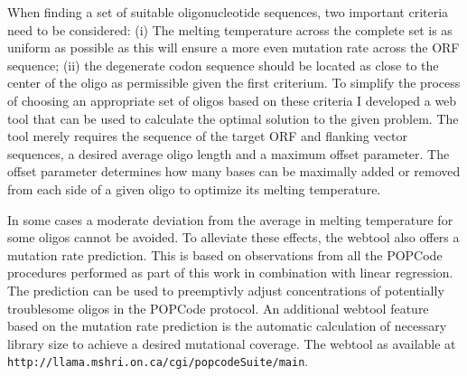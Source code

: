 When finding a set of suitable oligonucleotide sequences, two important criteria need to be considered: 
(i) The melting temperature across the complete set is as uniform as possible as this will ensure a more even mutation rate across the ORF sequence; (ii) the degenerate codon sequence should be located as close to the center of the oligo as permissible given the first criterium. To simplify the process of choosing an appropriate set of oligos based on these criteria I developed a web tool that can be used to calculate the optimal solution to the given problem. The tool merely requires the sequence of the target ORF and flanking vector sequences, a desired average oligo length and a maximum offset parameter. The offset parameter determines how many bases can be maximally added or removed from each side of a given oligo to optimize its melting temperature. 

In some cases a moderate deviation from the average in melting temperature for some oligos cannot be avoided. To alleviate these effects, the webtool also offers a mutation rate prediction. This is based on observations from all the POPCode procedures performed as part of this work in combination with linear regression. The prediction can be used to preemptivly adjust concentrations of potentially troublesome oligos in the POPCode protocol. An additional webtool feature based on the mutation rate prediction is the automatic calculation of necessary library size to achieve a desired mutational coverage. The webtool as available at \verb|http://llama.mshri.on.ca/cgi/popcodeSuite/main|.


